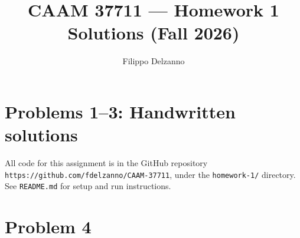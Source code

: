 \documentclass[11pt]{article}
\title{CAAM 37711 --- Homework 1 Solutions (Fall 2026)}
\author{Filippo Delzanno}
\begin{document}
\maketitle

\section*{Problems 1--3: Handwritten solutions}


All code for this assignment is in the GitHub repository \texttt{https://github.com/fdelzanno/CAAM-37711}, under the \texttt{homework-1/} directory. See \texttt{README.md} for setup and run instructions.

\section*{Problem 4}
\end{document}
